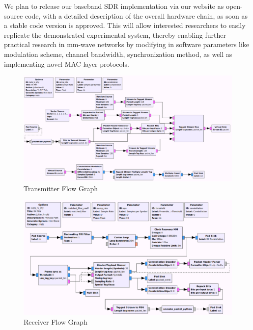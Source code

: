 \documentclass{sig-alternate}
\begin{document}
We plan to release our baseband SDR implementation via our website \cite{gr-inets} as open-source code, with a detailed description of the overall hardware chain, as soon as a stable code version is approved. This will allow interested researchers to easily replicate the demonstrated experimental system, thereby enabling further practical research in mm-wave networks by modifying in software parameters like modulation scheme, channel bandwidth, synchronization method, as well as implementing novel MAC layer protocols.

\begin{figure}[p]
\center
\includegraphics[scale=0.41]{tx_path.png}
\caption{Transmitter Flow Graph}
\label{fig:tx-path}
\end{figure}

\begin{figure}[p]
\center
\includegraphics[scale=0.41]{rx_path.png}
\caption{Receiver Flow Graph}
\label{fig:rx-path}
\end{figure}
\end{document}
